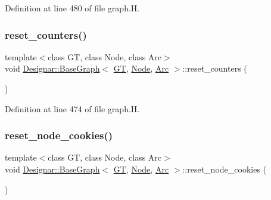 Definition at line 480 of file graph.\+H.

\mbox{\label{class_designar_1_1_base_graph_a881c342d8f25d43f995ccfdf876622e1}} 
\subsubsection{\texorpdfstring{reset\+\_\+counters()}{reset\_counters()}}
{\footnotesize\ttfamily template$<$class GT, class Node, class Arc$>$ \\
void \hyperlink{class_designar_1_1_base_graph}{Designar\+::\+Base\+Graph}$<$ \hyperlink{demo-buildgraph_8_c_a3001c40d2c31ca87ed96cd7d1334a55e}{GT}, \hyperlink{namespace_designar_a5af326c65aa2bd26b26c410f2030d09e}{Node}, \hyperlink{namespace_designar_a3f55fb5513d62ff47cbc8f72b8e95d6f}{Arc} $>$\+::reset\+\_\+counters (\begin{DoxyParamCaption}{ }\end{DoxyParamCaption})\hspace{0.3cm}{\ttfamily [inline]}}



Definition at line 474 of file graph.\+H.

\mbox{\label{class_designar_1_1_base_graph_ab797f80e7efa5a6d0b33f925d6079c18}} 
\subsubsection{\texorpdfstring{reset\+\_\+node\+\_\+cookies()}{reset\_node\_cookies()}}
{\footnotesize\ttfamily template$<$class GT, class Node, class Arc$>$ \\
void \hyperlink{class_designar_1_1_base_graph}{Designar\+::\+Base\+Graph}$<$ \hyperlink{demo-buildgraph_8_c_a3001c40d2c31ca87ed96cd7d1334a55e}{GT}, \hyperlink{namespace_designar_a5af326c65aa2bd26b26c410f2030d09e}{Node}, \hyperlink{namespace_designar_a3f55fb5513d62ff47cbc8f72b8e95d6f}{Arc} $>$\+::reset\+\_\+node\+\_\+cookies (\begin{DoxyParamCaption}{ }\end{DoxyParamCaption})\hspace{0.3cm}{\ttfamily [inline]}}



